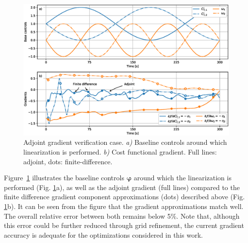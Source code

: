 \documentclass[energies,article,submit,moreauthors,latex,10pt,a4paper]{mdpi}
\newcommand{\bs}[1]{\boldsymbol{#1}}
\begin{document}
\begin{figure}[h!]
	\includegraphics[width=\textwidth]{figure19}
	\caption{Adjoint gradient verification case. \emph{a)} Baseline controls around which linearization is performed. \emph{b)} Cost functional gradient. Full lines: adjoint, dots: finite-difference. \label{fig:gradient_verification}}
\end{figure}

Figure~\ref{fig:gradient_verification} illustrates the baseline controls $\bs{\varphi}$ around which the linearization is performed (Fig. \ref{fig:gradient_verification}a), as well as the adjoint gradient (full lines) compared to the finite difference gradient component approximations (dots) described above (Fig. \ref{fig:gradient_verification}b). It can be seen from the figure that the gradient approximations match well. The overall relative error between both remains below 5$\%$. Note that, although this error could be further reduced through grid refinement, the current gradient accuracy is adequate for the optimizations considered in this work.
\end{document}
